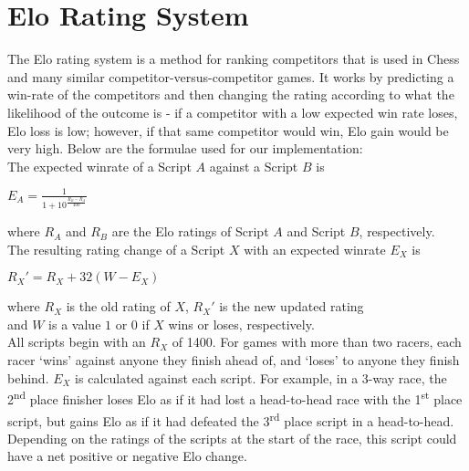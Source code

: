 \section{Elo Rating System}
\label{Elo}
The Elo rating system\cite{elo} is a method for ranking competitors that is used in Chess and many similar competitor-versus-competitor games. It works by predicting a win-rate of the competitors and then changing the rating according to what the likelihood of the outcome is - if a competitor with a low expected win rate loses, Elo loss is low; however, if that same competitor would win, Elo gain would be very high. Below are the formulae used for our implementation:\\

\noindent The expected winrate of a Script $A$ against a Script $B$ is \\

{\Large\centerline{$E_{A} = \frac{1}{1 + 10^\frac{R_{B}-R_{A}}{400}}$}} \vspace{2mm}

\hspace*{5mm} where $R_{A}$ and $R_{B}$ are the Elo ratings of Script $A$ and Script $B$, respectively.\\

\noindent The resulting rating change of a Script $X$ with an expected winrate $E_{X}$ is \\

{\Large\centerline{$R_{X}' = R_{X} + 32(W - E_{X})$}} \vspace{2mm}

\hspace*{5mm} where $R_{X}$ is the old rating of $X$, $R_{X}'$ is the new updated rating \\
\hspace*{17mm} and $W$ is a value $1$ or $0$ if $X$ wins or loses, respectively.\\

All scripts begin with an $R_{X}$ of 1400.  For games with more than two racers, each racer `wins' against anyone they finish ahead of, and `loses' to anyone they finish behind. $E_{X}$ is calculated against each script. For example, in a 3-way race, the 2\textsuperscript{nd} place finisher loses Elo as if it had lost a head-to-head race with the 1\textsuperscript{st} place script, but gains Elo as if it had defeated the 3\textsuperscript{rd} place script in a head-to-head. Depending on the ratings of the scripts at the start of the race, this script could have a net positive or negative Elo change.

